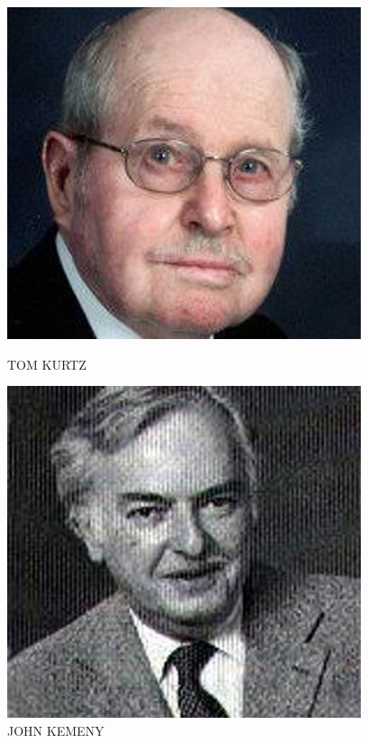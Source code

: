 \documentclass{article}
\begin{document}
	\begin{figure}
		\begin{minipage}{0.37\textwidth}
			\centering
			\includegraphics[width=1.0\linewidth]{"TOM KURTZ"}
			\caption{TOM KURTZ}
		\end{minipage}
	\begin{minipage}{0.37\textwidth}
		\centering
		\includegraphics[width=1.0\linewidth]{"JOHN KENNY"}
		\caption{JOHN KEMENY}
	\end{minipage}
		
	\end{figure}
\end{document}
